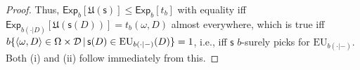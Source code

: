 \documentclass[a4paper]{article}
\newtheorem{theorem}{Theorem}
\newcommand\D{\mathcal{D}}
\newcommand\s{\mathsf{s}}
\newcommand\Exp{\mathsf{Exp}}
\newcommand\EU{\mathrm{EU}}
\newcommand\U{\mathfrak{U}} %
\newcommand{\pb}{b}
\renewcommand{\color}[1]{}
\newcommand\SetDelimiter[1][]{
	\nonscript\,#1\vert \allowbreak \nonscript\,\mathopen{}}
\providecommand\given{\SetDelimiter}
\renewcommand{\leq}{\leqslant}
\renewcommand{\geq}{\geqslant}
\newenvironment{CCM rewritten}
{\begingroup\color{blue}} %
{\endgroup}              %
\begin{document}
\begin{proof}
	Thus, $\Exp_b[\U(\s)]\leq \Exp_b [t_b]$ with equality iff $\Exp_{\pb(\cdot|D)}[\U(\s(D))]=t_b(\omega,D)$ almost everywhere, which is true iff $b\{\left<\omega,D\right> \in \Omega\times\D \given \s(D)\in \EU_{\pb(\cdot|-)}(D)\}=1$, i.e., iff $\s$ $\pb$-surely picks for $\EU_{\pb(\cdot|-)}$. Both (i) and (ii) follow immediately from this.
	\end{proof}

\begin{comment}
\begin{theorem}\label{thm:EU appendix}Suppose $p$ is a probability function over $\Omega$ and $\mu$ is a measure over $\D$. Then:
	\begin{enumerate}[{\normalfont (i)}]
		\item  If $\nu$ $\mu$-surely picks for $\EU_p$ then, for any $\nu'$, $\EU_{p\times\mu}[\U(\nu)]\geq\EU_{p\times\mu}[\U(\nu')]$
		\item If $\nu$ $\mu$-surely picks for $\EU_p$, and $\nu'$ does not, then $\EU_{p\times\mu}[\U(\nu)]>\EU_{p\times\mu}[\U(\nu')]$.
	\end{enumerate}
\end{theorem}
\begin{proof}
	Let $m_D(p):=\sup\{\Exp_p[\U(a)]\given a\in D\}$.
	
	So $\Exp_p[\U(a)]\leq m_D(p)$ for all $a\in D$, with equality only if $a\in \EU_p(D)$. 
	
	Since $\nu_D$ is a probability over $D$, we know that $\Exp_{\nu(D)}\Exp_p[\U]\leq m_D(p)$ with equality only if $\nu_D(\EU_p(D))=1$. And note that $\Exp_{\nu(D)}\Exp_p(a)=\Exp_p[\U(\nu)(D)]$
%	
%		
		

\end{comment}
\end{document}
